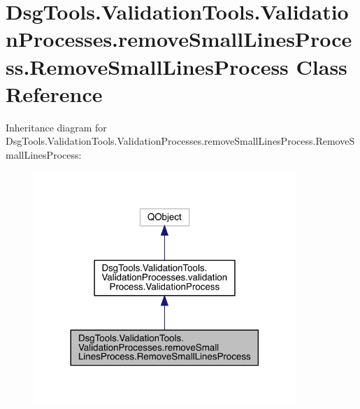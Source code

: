 \hypertarget{class_dsg_tools_1_1_validation_tools_1_1_validation_processes_1_1remove_small_lines_process_1_1_remove_small_lines_process}{}\section{Dsg\+Tools.\+Validation\+Tools.\+Validation\+Processes.\+remove\+Small\+Lines\+Process.\+Remove\+Small\+Lines\+Process Class Reference}
\label{class_dsg_tools_1_1_validation_tools_1_1_validation_processes_1_1remove_small_lines_process_1_1_remove_small_lines_process}


Inheritance diagram for Dsg\+Tools.\+Validation\+Tools.\+Validation\+Processes.\+remove\+Small\+Lines\+Process.\+Remove\+Small\+Lines\+Process\+:
\nopagebreak
\begin{figure}[H]
\begin{center}
\leavevmode
\includegraphics[width=281pt]{class_dsg_tools_1_1_validation_tools_1_1_validation_processes_1_1remove_small_lines_process_1_1_fc0503e8aeade5a598ad813a535c594c}
\end{center}
\end{figure}


